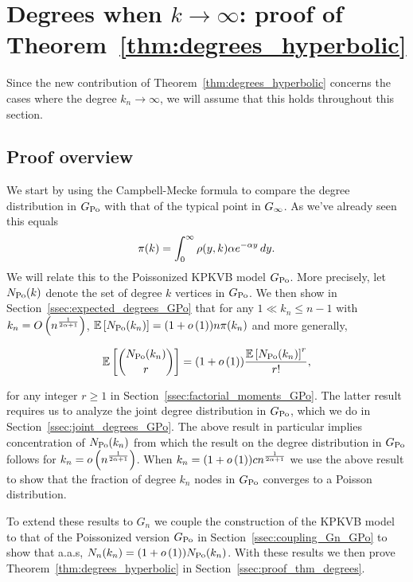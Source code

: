 
\section{Degrees when $k\to\infty$: proof of Theorem~\ref{thm:degrees_hyperbolic}\label{sec:degrees}}

Since the new contribution of Theorem~\ref{thm:degrees_hyperbolic} concerns the cases where the degree $k_n \to \infty$, we 
will assume that this holds throughout this section.

\subsection{Proof overview}

We start by using the Campbell-Mecke formula to compare the degree distribution in $G_{{\mathrm{Po}}}$ with that of the typical point in $G_{\infty}$. 
As we've already seen this equals 
\[
	{\pi}(k) = \int_0^\infty \rho(y,k) \alpha e^{-\alpha y} \, dy.
\]
We will relate this to the Poissonized KPKVB model $G_{{\mathrm{Po}}}$. 
More precisely, let $N_{{\mathrm{Po}}}(k)$ denote the set of degree $k$ vertices in $G_{{\mathrm{Po}}}$. 
We then show in Section~\ref{ssec:expected_degrees_GPo} that for any $1 \ll k_n \le n -1$ with 
$k_n = O\left(n^{\frac{1}{2\alpha + 1}}\right)$, $\mathbb{E}\left[N_{{\mathrm{Po}}}(k_n)\right] = (1+o\left(1\right)) n {\pi}(k_n)$ and more generally,

\begin{equation}\label{eq:def_factorial_moments_GPo}
	\mathbb{E}\left[\binom{N_{{\mathrm{Po}}}(k_n)}{r}\right] = (1+o\left(1\right)) \frac{\mathbb{E}\left[N_{{\mathrm{Po}}}(k_n)\right]^r}{r!},
\end{equation}

\noindent
for any integer $r \ge 1$ in Section~\ref{ssec:factorial_moments_GPo}. 
The latter result requires us to analyze the joint degree distribution in $G_{{\mathrm{Po}}}$, which we do in Section~\ref{ssec:joint_degrees_GPo}. 
The above result in particular implies concentration of $N_{{\mathrm{Po}}}(k_n)$ from which the result on the degree distribution in $G_{{\mathrm{Po}}}$ follows for $k_n = o\left(n^{\frac{1}{2\alpha + 1}}\right)$. When $k_n = (1+o\left(1\right)) c n^{\frac{1}{2\alpha + 1}}$ we use the above result to show that the fraction of degree $k_n$ nodes in $G_{{\mathrm{Po}}}$ converges to a Poisson distribution. 

To extend these results to $G_n$ we couple the construction of the KPKVB model to that of the Poissonized version $G_{{\mathrm{Po}}}$ in Section~\ref{ssec:coupling_Gn_GPo} to show that a.a.s, $N_n(k_n) = (1+o\left(1\right)) N_{{\mathrm{Po}}}(k_n)$. With these results we then prove Theorem~\ref{thm:degrees_hyperbolic} in Section~\ref{ssec:proof_thm_degrees}.

